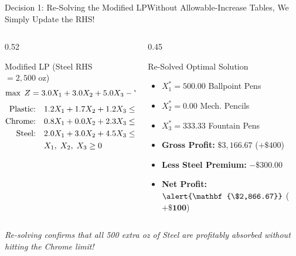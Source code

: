 \documentclass{beamer}
\begin{document}
\begin{frame}{Decision 1: Re-Solving the Modified LP}{Without Allowable-Increase Tables, We Simply Update the RHS!}
    \begin{columns}[T]
        \begin{column}{0.52\textwidth}
            \begin{block}{Modified LP (Steel RHS $= 2,500\text{ oz}$)}
                \footnotesize
                \[ \max \; Z = 3.0 X_1 + 3.0 X_2 + 5.0 X_3 - \alert{\mathbf{300}} \]
                \vspace{-0.6em}
                \begin{align*}
                \text{Plastic:}\quad & 1.2 X_1 + 1.7 X_2 + 1.2 X_3 \le 1000 \\
                \text{Chrome:}\quad  & 0.8 X_1 + 0.0 X_2 + 2.3 X_3 \le 1200 \\
                \text{Steel:}\quad   & 2.0 X_1 + 3.0 X_2 + 4.5 X_3 \le \alert{\mathbf{2500}} \\
                & X_1,\; X_2,\; X_3 \ge 0
                \end{align*}
            \end{block}
        \end{column}
        \begin{column}{0.45\textwidth}
            \begin{exampleblock}{Re-Solved Optimal Solution}
                \footnotesize
                \begin{itemize}\setlength{\itemsep}{0.2em}
                    \item $X_1^* = 500.00$ Ballpoint Pens
                    \item $X_2^* = 0.00$ Mech. Pencils
                    \item $X_3^* = 333.33$ Fountain Pens
                    \item \textbf{Gross Profit:} $\$3,166.67$ ($+\$400$)
                    \item \textbf{Less Steel Premium:} $-\$300.00$
                    \item \textbf{Net Profit:} $\alert{\mathbf{\$2,866.67}}$ ($\mathbf{+\$100}$)
                \end{itemize}
            \end{exampleblock}
        \end{column}
    \end{columns}
    \vspace{0.2em}
    \centering \scriptsize \textit{Re-solving confirms that all 500 extra oz of Steel are profitably absorbed without hitting the Chrome limit!}
\end{frame}
\end{document}
